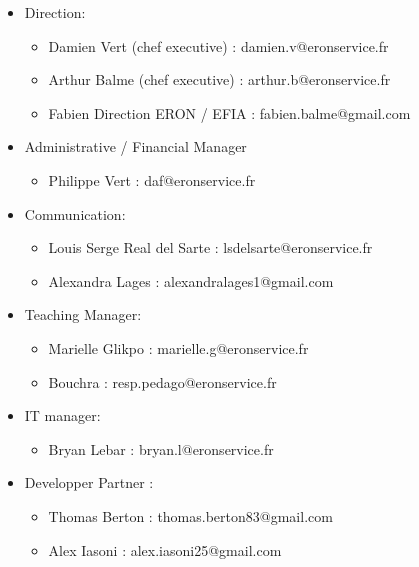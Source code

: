 \documentclass[
  12pt,
]{article}
\providecommand{\tightlist}{%
  \setlength{\itemsep}{0pt}\setlength{\parskip}{0pt}}
\begin{document}
\begin{itemize}
\tightlist
\item
  Direction:

  \begin{itemize}
  \tightlist
  \item
    Damien Vert (chef executive) : damien.v@eronservice.fr
  \item
    Arthur Balme (chef executive) : arthur.b@eronservice.fr
  \item
    Fabien Direction ERON / EFIA : fabien.balme@gmail.com
  \end{itemize}
\item
  Administrative / Financial Manager

  \begin{itemize}
  \tightlist
  \item
    Philippe Vert : daf@eronservice.fr
  \end{itemize}
\item
  Communication:

  \begin{itemize}
  \tightlist
  \item
    Louis Serge Real del Sarte : lsdelsarte@eronservice.fr
  \item
    Alexandra Lages : alexandralages1@gmail.com
  \end{itemize}
\item
  Teaching Manager:

  \begin{itemize}
  \tightlist
  \item
    Marielle Glikpo : marielle.g@eronservice.fr
  \item
    Bouchra : resp.pedago@eronservice.fr
  \end{itemize}
\item
  IT manager:

  \begin{itemize}
  \tightlist
  \item
    Bryan Lebar : bryan.l@eronservice.fr
  \end{itemize}
\item
  Developper Partner :

  \begin{itemize}
  \tightlist
  \item
    Thomas Berton : thomas.berton83@gmail.com
  \item
    Alex Iasoni : alex.iasoni25@gmail.com
  \end{itemize}
\end{itemize}
\end{document}
